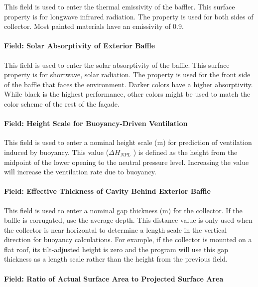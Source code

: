 This field is used to enter the thermal emissivity of the baffler. This surface property is for longwave infrared radiation. The property is used for both sides of collector. Most painted materials have an emissivity of 0.9.

\paragraph{Field: Solar Absorptivity of Exterior Baffle}\label{field-solar-absorptivity-of-exterior-baffle}

This field is used to enter the solar absorptivity of the baffle. This surface property is for shortwave, solar radiation. The property is used for the front side of the baffle that faces the environment. Darker colors have a higher absorptivity. While black is the highest performance, other colors might be used to match the color scheme of the rest of the façade.

\paragraph{Field: Height Scale for Buoyancy-Driven Ventilation}\label{field-height-scale-for-buoyancy-driven-ventilation}

This field is used to enter a nominal height scale (m) for prediction of ventilation induced by buoyancy. This value (\(\Delta {H_{NPL}}\) ) is defined as the height from the midpoint of the lower opening to the neutral pressure level. Increasing the value will increase the ventilation rate due to buoyancy.

\paragraph{Field: Effective Thickness of Cavity Behind Exterior Baffle}\label{field-effective-thickness-of-cavity-behind-exterior-baffle}

This field is used to enter a nominal gap thickness (m) for the collector. If the baffle is corrugated, use the average depth. This distance value is only used when the collector is near horizontal to determine a length scale in the vertical direction for buoyancy calculations. For example, if the collector is mounted on a flat roof, its tilt-adjusted height is zero and the program will use this gap thickness as a length scale rather than the height from the previous field.

\paragraph{Field: Ratio of Actual Surface Area to Projected Surface Area}\label{field-ratio-of-actual-surface-area-to-projected-surface-area}

